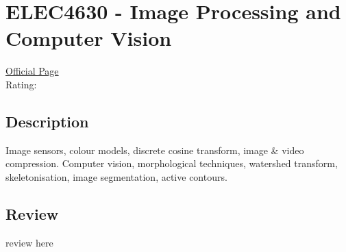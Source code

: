 \hypertarget{ELEC4630}{\section{ELEC4630 - Image Processing and Computer Vision}}

\large
\textcolor{turbo_purple}{\href{https://my.uq.edu.au/programs-courses/course.html?course_code=ELEC4630}{Official Page}} \\
Rating: \cstar\cstar\cstar\cstar\ostar

\normalsize
\subsection*{Description}
Image sensors, colour models, discrete cosine transform, image \& video compression.
Computer vision, morphological techniques, watershed transform, skeletonisation, image segmentation, active contours.

\subsection*{Review}
review here
